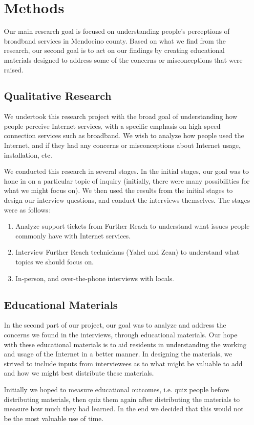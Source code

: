 \section{Methods}
\label{sec:methods}

Our main research goal is focused on understanding people's perceptions of
broadband services in Mendocino county. Based on what we find from the research,
our second goal is to act on our findings by creating educational materials
designed to address some of the concerns or misconceptions that were raised.

\subsection{Qualitative Research}
\label{subsec:qualitative_research}

We undertook this research project with the broad goal of understanding how
people perceive Internet services, with a specific emphasis on high speed
connection services such as broadband. We wish to analyze how people used
the Internet, and if they had any concerns or misconceptions about Internet
usage, installation, etc.

We conducted this research in several stages. In the initial stages, our goal
was to hone in on a particular topic of inquiry (initially, there were many
possibilities for what we might focus on). We then used the results from the
initial stages to design our interview questions, and conduct the interviews
themselves. The stages were as follows:

\begin{enumerate}
\item Analyze support tickets from Further Reach to understand what issues
people commonly have with Internet services.
\item Interview Further Reach technicians (Yahel and Zean) to understand what
topics we should focus on.
\item In-person, and over-the-phone interviews with locals.
\end{enumerate}

\subsection{Educational Materials}

In the second part of our project, our goal was to analyze
and address the concerns we found in the interviews, through educational
materials. Our hope with these educational materials is to
aid residents in understanding the working and usage of the Internet in a
better manner. In designing the materials, we strived to include inputs from
interviewees as to what might be valuable to add and how we might best
distribute these materials.

Initially we hoped to measure educational outcomes, i.e. quiz people before
distributing materials, then quiz them again after distributing the materials
to measure how much they had learned. In the end we decided that this would
not be the most valuable use of time.

